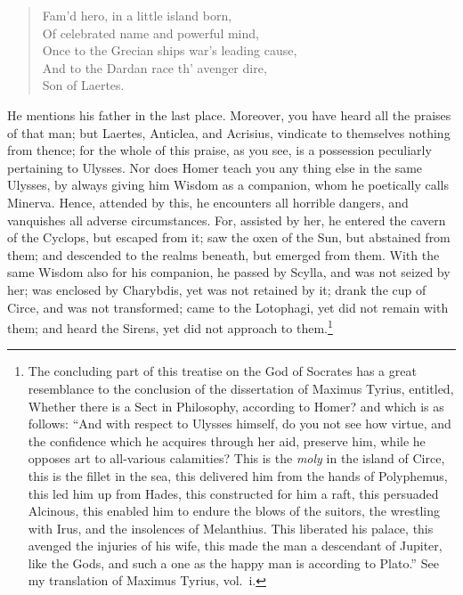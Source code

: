 \documentclass[12pt]{article}
\begin{document}
\begin{verse}
Fam'd hero, in a little island born,\\
Of celebrated name and powerful mind,\\
Once to the Grecian ships war's leading cause,\\
And to the Dardan race th' avenger dire,\\
Son of Laertes.
\end{verse}

\noindent He mentions his father in the last place. Moreover, you have heard
all the praises of that man; but Laertes, Anticlea, and Acrisius, vindicate
to themselves nothing from thence; for the whole of this praise, as you see, is
a possession peculiarly pertaining to Ulysses. Nor does Homer teach you any
thing else in the same Ulysses, by always giving him Wisdom as a companion,
whom he poetically calls Minerva. Hence, attended by this, he encounters all
horrible dangers, and vanquishes all adverse circumstances. For, assisted by
her, he entered the cavern of the Cyclops, but escaped from it; saw the oxen of
the Sun, but abstained from them; and descended to the realms beneath, but
emerged from them. With the same Wisdom also for his companion, he passed by
Scylla, and was not seized by her; was enclosed by Charybdis, yet was not
retained by it; drank the cup of Circe, and was not transformed; came to the
Lotophagi, yet did not remain with them; and heard the Sirens, yet did not
approach to them.\footnote{The concluding part of this treatise on the God of
Socrates has a great resemblance to the conclusion of the dissertation of
Maximus Tyrius, entitled, Whether there is a Sect in Philosophy,
according to Homer? and which is as follows: ``And with respect to Ulysses
himself, do you not see how virtue, and the confidence which he acquires
through her aid, preserve him, while he opposes art to all-various calamities?
This is the \textit{moly} in the island of Circe, this is the fillet in the
sea, this delivered him from the hands of Polyphemus, this led him up from
Hades, this constructed for him a raft, this persuaded Alcinous, this enabled
him to endure the blows of the suitors, the wrestling with Irus, and the
insolences of Melanthius. This liberated his palace, this avenged the injuries
of his wife, this made the man a descendant of Jupiter, like the Gods, and such
a one as the happy man is according to Plato.'' See my translation of Maximus
Tyrius, vol.~i.}
\end{document}
